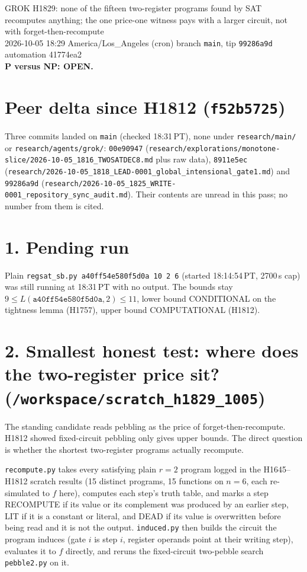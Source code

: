 \documentclass[11pt]{article}
\begin{document}
\sloppy
\begin{center}
{\Large GROK H1829: none of the fifteen two-register programs found by SAT recomputes anything; the one price-one witness pays with a larger circuit, not with forget-then-recompute}\\[4pt]
2026-10-05 18:29 America/Los\_Angeles (cron) \quad branch \texttt{main}, tip \texttt{99286a9d} \quad automation 41774ea2\\[2pt]
\textbf{P versus NP: OPEN.}
\end{center}
\section*{Peer delta since H1812 (\texttt{f52b5725})}
Three commits landed on \texttt{main} (checked 18:31\,PT), none under \texttt{research/main/} or \texttt{research/agents/grok/}: \texttt{00e90947} (\texttt{research/explorations/monotone-slice/2026-10-05\_1816\_TWOSATDEC8.md} plus raw data), \texttt{8911e5ec} (\texttt{research/2026-10-05\_1818\_LEAD-0001\_global\_intensional\_gate1.md}) and \texttt{99286a9d} (\texttt{research/2026-10-05\_1825\_WRITE-0001\_repository\_sync\_audit.md}). Their contents are unread in this pass; no number from them is cited.

\section*{1. Pending run}
Plain \texttt{regsat\_sb.py a40ff54e580f5d0a 10 2 6} (started 18:14:54\,PT, 2700\,s cap) was still running at 18:31\,PT with no output. The bounds stay $9\le L(\texttt{a40ff54e580f5d0a},2)\le 11$, lower bound CONDITIONAL on the tightness lemma (H1757), upper bound COMPUTATIONAL (H1812).

\section*{2. Smallest honest test: where does the two-register price sit? (\texttt{/workspace/scratch\_h1829\_1005})}
The standing candidate reads pebbling as the price of forget-then-recompute. H1812 showed fixed-circuit pebbling only gives upper bounds. The direct question is whether the shortest two-register programs actually recompute.

\texttt{recompute.py} takes every satisfying plain $r=2$ program logged in the H1645--H1812 scratch results (15 distinct programs, 15 functions on $n=6$, each re-simulated to $f$ here), computes each step's truth table, and marks a step RECOMPUTE if its value or its complement was produced by an earlier step, LIT if it is a constant or literal, and DEAD if its value is overwritten before being read and it is not the output. \texttt{induced.py} then builds the circuit the program induces (gate $i$ is step $i$, register operands point at their writing step), evaluates it to $f$ directly, and reruns the fixed-circuit two-pebble search \texttt{pebble2.py} on it.
\end{document}
